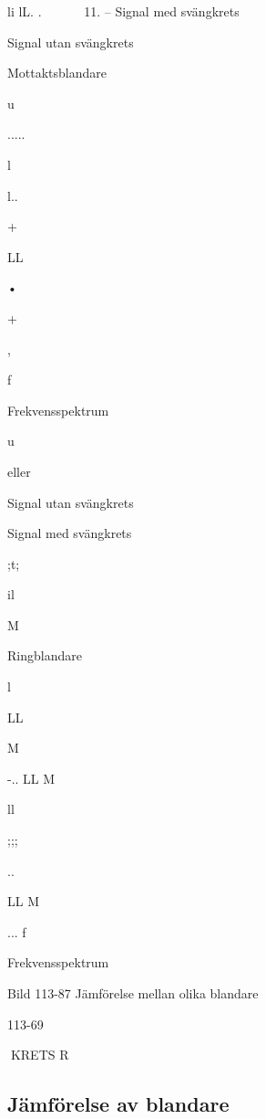 li lL. . ~ ~~ ~ 11.
--
Signal med svängkrets

Signal utan svängkrets

Mottaktsblandare

u

.....

l

l..

+

LL

•

+

, 

f

Frekvensspektrum

u

eller

Signal utan svängkrets

Signal med svängkrets

;t;

il

M

Ringblandare

l

LL

M

-..
LL
M

ll

;;;

..

LL
M

... f

Frekvensspektrum

Bild 113-87 Jämförelse mellan olika blandare

113-69

KRETS R
\subsection{Jämförelse av blandare}

